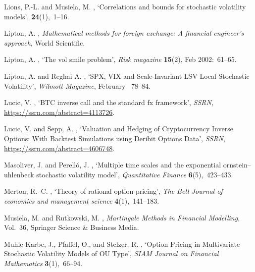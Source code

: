 \documentclass[pdftex,11pt,a4paper] {article}
\begin{document}
\begin{thebibliography}{}
Lions, P.-L. and Musiela, M.  \harvardyearright ,
  `Correlations and bounds for stochastic volatility models', {\bf
  24}(1),~1--16.

Lipton, A.  \harvardyearright , {\em Mathematical methods
  for foreign exchange: A financial engineer's approach}, World Scientific.

Lipton, A.  \harvardyearright , `The vol smile problem', {\em Risk magazine} {\bf 15}(2), Feb 2002:~61--65.


Lipton, A. and Reghai A.  \harvardyearright , `SPX, VIX and Scale-Invariant LSV Local Stochastic Volatility',
  {\em Wilmott Magazine}, February ~78--84.
	
Lucic, V.  \harvardyearright , `BTC inverse call and the
  standard fx framework', {\em SSRN}, \url{https://ssrn.com/abstract=4113726}.

Lucic, V. and Sepp, A. \harvardyearright , `Valuation and Hedging of Cryptocurrency Inverse Options: With Backtest Simulations using Deribit Options Data', {\em SSRN}, \url{https://ssrn.com/abstract=4606748}.
	
Masoliver, J. and Perell{\'o}, J.  \harvardyearright , `Multiple time scales and the exponential
  ornstein--uhlenbeck stochastic volatility model', {\em Quantitative Finance}
  {\bf 6}(5),~423--433.

Merton, R.~C.  \harvardyearright , `Theory of rational option pricing', {\em The Bell Journal of economics and management science} {\bf 4}(1),~141--183.

Musiela, M. and Rutkowski, M.  \harvardyearright
  , {\em Martingale Methods in Financial Modelling}, Vol.~36, Springer Science
  \& Business Media.
  
Muhle-Karbe, J., Pfaffel, O., and Stelzer, R. \harvardyearright , `Option Pricing in Multivariate Stochastic Volatility Models of OU Type', {\em SIAM Journal on Financial Mathematics} {\bf 3}(1),~66--94.
  

\end{thebibliography}
\end{document}
